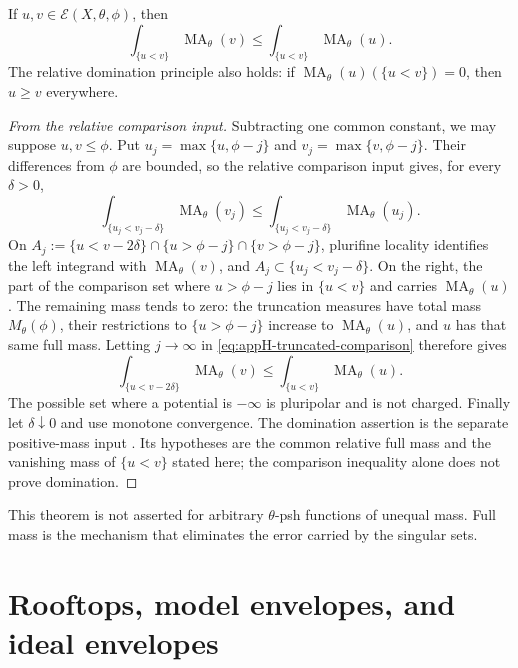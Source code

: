 \begin{theorem}\label{thm:appH-comparison}
If \(u,v\in\mathcal E(X,\theta,\phi)\), then
\[
 \int_{\{u<v\}}\operatorname{MA}_\theta(v)
 \leq
 \int_{\{u<v\}}\operatorname{MA}_\theta(u).
\]
The relative domination principle also holds: if
\(\operatorname{MA}_\theta(u)(\{u<v\})=0\), then \(u\geq v\) everywhere.
\end{theorem}

\begin{proof}[From the relative comparison input]
Subtracting one common constant, we may suppose \(u,v\leq\phi\).  Put
\(u_j=\max\{u,\phi-j\}\) and
\(v_j=\max\{v,\phi-j\}\).  Their differences from \(\phi\) are bounded,
so the relative comparison input \cite[Proposition~3.1.15]{XiaBook}
gives, for every \(\delta>0\),
\[
 \int_{\{u_j<v_j-\delta\}}\operatorname{MA}_\theta(v_j)
 \leq
 \int_{\{u_j<v_j-\delta\}}\operatorname{MA}_\theta(u_j).
\tag{H.1}\label{eq:appH-truncated-comparison}
\]
On
\(A_j:=\{u<v-2\delta\}\cap\{u>\phi-j\}\cap\{v>\phi-j\}\),
plurifine locality identifies the left integrand with
\(\operatorname{MA}_\theta(v)\), and
\(A_j\subset\{u_j<v_j-\delta\}\).  On the right, the part of the comparison
set where \(u>\phi-j\) lies in \(\{u<v\}\) and carries
\(\operatorname{MA}_\theta(u)\).  The remaining mass tends to zero: the
truncation measures have total mass \(M_\theta(\phi)\), their restrictions
to \(\{u>\phi-j\}\) increase to
\(\operatorname{MA}_\theta(u)\), and \(u\) has that same full mass.
Letting \(j\to\infty\) in \eqref{eq:appH-truncated-comparison} therefore
gives
\[
 \int_{\{u<v-2\delta\}}\operatorname{MA}_\theta(v)
 \leq
 \int_{\{u<v\}}\operatorname{MA}_\theta(u).
\]
The possible set where a potential is \(-\infty\) is pluripolar and is not
charged.  Finally let \(\delta\downarrow0\) and use monotone convergence.
The domination assertion is the separate positive-mass input
\cite[Theorem~2.4.5 and Remark~2.4.3]{XiaBook}.  Its hypotheses are the
common relative full mass and the vanishing mass of \(\{u<v\}\) stated
here; the comparison inequality alone does not prove domination.
\end{proof}

This theorem is not asserted for arbitrary \(\theta\)-psh functions of
unequal mass. Full mass is the mechanism that eliminates the error carried
by the singular sets.

\section{Rooftops, model envelopes, and ideal envelopes}
\label{sec:appH-envelopes}

